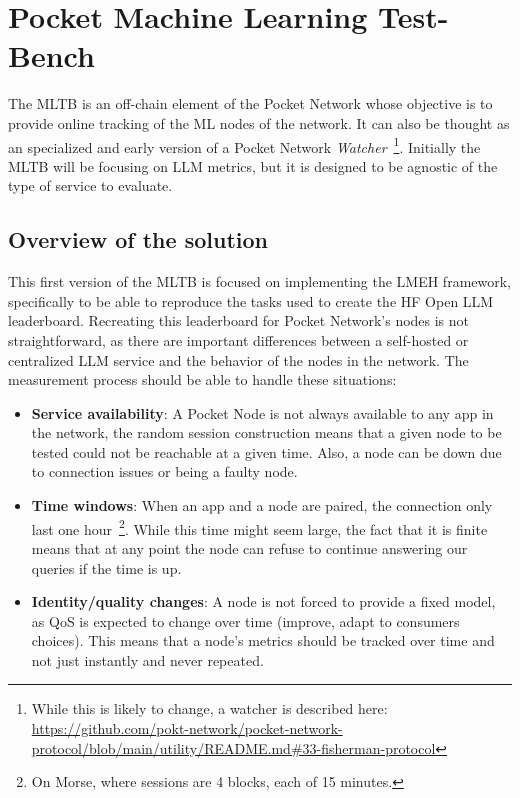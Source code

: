\section{Pocket Machine Learning Test-Bench}\label{sec:c}

The \gls{MLTB} is an off-chain element of the Pocket Network whose objective is to provide online tracking of the \gls{ML} nodes of the network. It can also be thought as an specialized and early version of a Pocket Network \emph{Watcher}~\footnote{While this is likely to change, a watcher is described here: \url{https://github.com/pokt-network/pocket-network-protocol/blob/main/utility/README.md\#33-fisherman-protocol}}.
Initially the \gls{MLTB} will be focusing on \gls{LLM} metrics, but it is designed to be agnostic of the type of service to evaluate.

\subsection{Overview of the solution}

This first version of the \gls{MLTB} is focused on implementing the \gls{LMEH} framework, specifically to be able to reproduce the tasks used to create the \gls{HF} Open \gls{LLM} leaderboard. Recreating this leaderboard for Pocket Network's nodes is not straightforward, as there are important differences between a self-hosted or centralized \gls{LLM} service and the behavior of the nodes in the network. The measurement process should be able to handle these situations:
\begin{itemize}
    \item \textbf{Service availability}: A Pocket Node is not always available to any app in the network, the random session construction means that a given node to be tested could not be reachable at a given time. Also, a node can be down due to connection issues or being a faulty node. 
    \item \textbf{Time windows}: When an app and a node are paired, the connection only last one hour~\footnote{On Morse, where sessions are 4 blocks, each of 15 minutes.}. While this time might seem large, the fact that it is finite means that at any point the node can refuse to continue answering our queries if the time is up.
    \item \textbf{Identity/quality changes}: A node is not forced to provide a fixed model, as \gls{QoS} is expected to change over time (improve, adapt to consumers choices). This means that a node's metrics should be tracked over time and not just instantly and never repeated.
\end{itemize}

